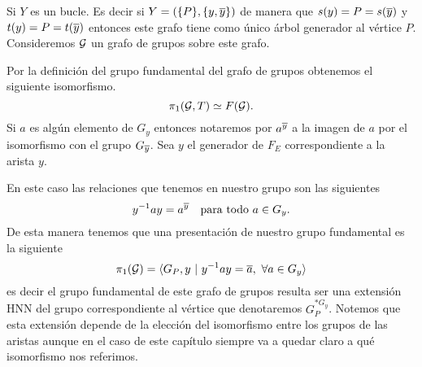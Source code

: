 \documentclass[tesis.tex]{subfiles}
\begin{document}
\begin{ej}\label{ej_pi1_bucle}
	Si $Y$ es un bucle. 
	Es decir si $Y = (\{P\}, \{y,\overline y \})$ de manera que $s(y)=P=s(\overline y)$ y $t(y) = P = t(\overline y)$ entonces este grafo tiene como único árbol generador al vértice $P$.
	Consideremos ${\cal G}$ un grafo de grupos sobre este grafo.
\begin{center}
\end{center}
	
	Por la definición del grupo fundamental del grafo de grupos obtenemos el siguiente isomorfismo. 
	\[
		\pi_1({\cal G},T) \simeq F({\cal G}).
	\]
	Si $a$ es algún elemento de $G_y$ entonces notaremos por $a^{\overline y}$ a la imagen de $a$ por el isomorfismo con el grupo $G_{\overline y}$.
	Sea $y$ el generador de $F_{E}$ correspondiente a la arista $y$.
		 
	En este caso las relaciones que tenemos en nuestro grupo son las siguientes
	\[
	y^{-1}ay = a^{\ol y}  \  \ \ \text{para todo} \ a \in G_y.
	\]   
	De esta manera tenemos que una presentación de nuestro grupo fundamental es la siguiente
	\[
	\pi_1({\cal G}) = \langle G_P, y \ | \ y^{-1}ay = \overline{a}, \ \forall a \in G_y \rangle
	\]
	es decir el grupo fundamental de este grafo de grupos resulta ser una extensión HNN del grupo correspondiente al vértice que denotaremos $G_P^{\ast G_y}$.
	Notemos que esta extensión depende de la elección del isomorfismo entre los grupos de las aristas aunque en el caso de este capítulo siempre va a quedar claro a qué isomorfismo nos referimos.
	
\end{ej}
\end{document}
